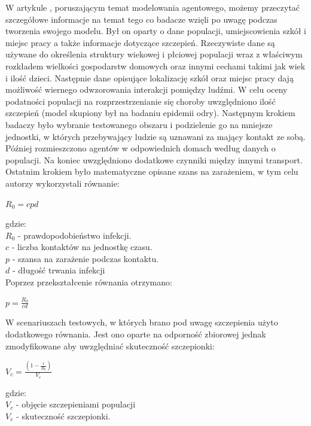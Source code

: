 W artykule \cite{bib:artykul1}, poruszającym temat modelowania agentowego, możemy przeczytać szczegółowe informacje na temat tego co badacze wzięli po uwagę podczas tworzenia swojego modelu.
Był on oparty o dane populacji, umiejscowienia szkół i miejsc pracy a także informacje dotyczące szczepień. Rzeczywiste dane są używane do określenia struktury wiekowej i płciowej populacji wraz z właściwym rozkładem wielkości gospodarstw domowych oraz innymi cechami takimi jak wiek i ilość dzieci. Następnie dane opisujące lokalizację szkół oraz miejsc pracy dają możliwość wiernego odwzorowania interakcji pomiędzy ludźmi. W celu oceny podatności populacji na rozprzestrzenianie się choroby uwzględniono ilość szczepień (model skupiony był na badaniu epidemii odry).
Następnym krokiem badaczy było wybranie testowanego obszaru i podzielenie go na mniejsze jednostki, w których przebywający ludzie są uznawani za mający kontakt ze sobą. Później rozmieszczono agentów w odpowiednich domach według danych o populacji. Na koniec uwzględniono dodatkowe czynniki między innymi transport. 
Ostatnim krokiem było matematyczne opisane szans na zarażeniem, w tym celu autorzy wykorzystali równanie:

\begin{center}
$R_0 = cpd$
\end{center}

gdzie:\\
$R_0$ - prawdopodobieństwo infekcji. \\
$c$ - liczba kontaktów na jednostkę czasu. \\
$p$ - szansa na zarażenie podczas kontaktu. \\
$d$ - długość trwania infekcji \\

Poprzez przekształcenie równania otrzymano: 
\begin{center}
$ p = \frac{R_0}{cd} $
\end{center}

W scenariuszach testowych, w których brano pod uwagę szczepienia użyto dodatkowego równania. Jest ono oparte na odporność zbiorowej jednak zmodyfikowane aby uwzględniać skuteczność szczepionki:

\begin{center}
	$V_c = \frac{(1-\frac{1}{R_0})}{V_e}$
\end{center}

gdzie:\\
$V_c$ - objęcie szczepieniami populacji \\
$V_e$ - skuteczność szczepionki. \\


